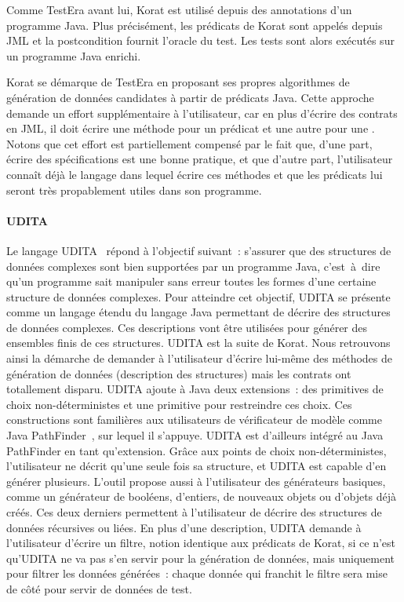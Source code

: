 Comme TestEra avant lui, Korat est utilisé depuis des annotations d'un programme
Java. Plus précisément, les prédicats de Korat sont appelés depuis JML et la
postcondition fournit l'oracle du test. Les tests sont alors exécutés sur un
programme Java enrichi.

Korat se démarque de TestEra en proposant ses propres algorithmes de génération
de données candidates à partir de prédicats Java. Cette approche demande un
effort supplémentaire à l'utilisateur, car en plus d'écrire des contrats en JML,
il doit écrire une méthode pour un prédicat et une autre pour une
. Notons que cet effort est partiellement compensé par
le fait que, d'une part, écrire des spécifications est une bonne pratique, et
que d'autre part, l'utilisateur connaît déjà le langage dans lequel écrire ces
méthodes et que les prédicats lui seront très propablement utiles dans son
programme.

\paragraph{UDITA} Le langage UDITA~ répond à l'objectif
suivant~: s'assurer que des structures de données complexes sont bien supportées
par un programme Java, c'est~à~dire qu'un programme sait manipuler sans erreur
toutes les formes d'une certaine structure de données complexes.  Pour atteindre
cet objectif, UDITA se présente comme un langage étendu du langage Java
permettant de décrire des structures de données complexes. Ces descriptions vont
être utilisées pour générer des ensembles finis de ces structures. UDITA est la
suite de Korat. Nous retrouvons ainsi la démarche de demander à l'utilisateur
d'écrire lui-même des méthodes de génération de données (description des
structures) mais les contrats ont totallement disparu. UDITA ajoute à Java deux
extensions~: des primitives de choix non-déterministes et une primitive pour
restreindre ces choix. Ces constructions sont familières aux utilisateurs de
vérificateur de modèle comme Java PathFinder~, sur lequel il
s'appuye. UDITA est d'ailleurs intégré au  Java PathFinder
en tant qu'extension. Grâce aux points de choix non-déterministes, l'utilisateur
ne décrit qu'une seule fois sa structure, et UDITA est capable d'en générer
plusieurs. L'outil propose aussi à l'utilisateur des générateurs basiques, comme
un générateur de booléens, d'entiers, de nouveaux objets ou d'objets déjà créés.
Ces deux derniers permettent à l'utilisateur de décrire des structures de
données récursives ou liées. En plus d'une description, UDITA demande à
l'utilisateur d'écrire un filtre, notion identique aux prédicats de Korat, si ce
n'est qu'UDITA ne va pas s'en servir pour la génération de données, mais
uniquement pour filtrer les données générées~: chaque donnée qui franchit le
filtre sera mise de côté pour servir de données de test.

